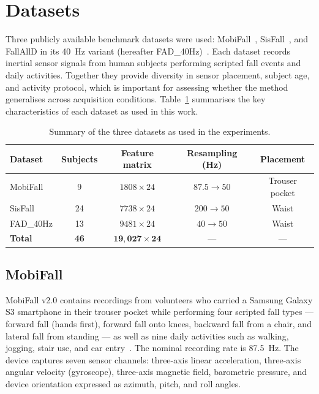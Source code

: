 \section{Datasets}
\label{subsec:datasets}

Three publicly available benchmark datasets were used: MobiFall~\parencite{mobifall}, SisFall~\parencite{sisfall}, and FallAllD in its 40~Hz variant (hereafter FAD\_40Hz)~\parencite{fallalld}. Each dataset records inertial sensor signals from human subjects performing scripted fall events and daily activities. Together they provide diversity in sensor placement, subject age, and activity protocol, which is important for assessing whether the method generalises across acquisition conditions. Table~\ref{tab:dataset_summary} summarises the key characteristics of each dataset as used in this work.

\begin{table}[h!]
\centering
\caption{Summary of the three datasets as used in the experiments.}
\label{tab:dataset_summary}
\setlength{\tabcolsep}{4pt}\footnotesize
\begin{tabular}{lcccc}
\toprule
\textbf{Dataset} & \textbf{Subjects} & \textbf{Feature matrix}
  & \textbf{Resampling (Hz)} & \textbf{Placement} \\
\midrule
MobiFall   &  9 & $1808 \times 24$ & $87.5 \to 50$ & Trouser pocket \\
SisFall    & 24 & $7738 \times 24$ & $200  \to 50$ & Waist \\
FAD\_40Hz  & 13 & $9481 \times 24$ & $40   \to 50$ & Waist \\
\midrule
\textbf{Total} & \textbf{46} & $\mathbf{19{,}027 \times 24}$ & --- & --- \\
\bottomrule
\end{tabular}
\end{table}

\subsection{MobiFall}
\label{subsubsec:mobifall}

MobiFall v2.0 contains recordings from volunteers who carried a Samsung Galaxy S3 smartphone in their trouser pocket while performing four scripted fall types --- forward fall (hands first), forward fall onto knees, backward fall from a chair, and lateral fall from standing --- as well as nine daily activities such as walking, jogging, stair use, and car entry~\parencite{mobifall}. The nominal recording rate is 87.5~Hz. The device captures seven sensor channels: three-axis linear acceleration, three-axis angular velocity (gyroscope), three-axis magnetic field, barometric pressure, and device orientation expressed as azimuth, pitch, and roll angles.


